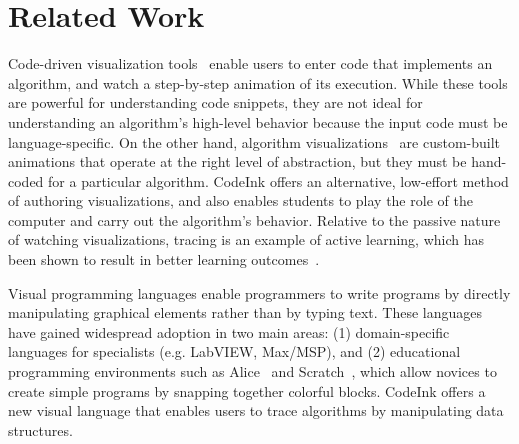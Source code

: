 \section{Related Work}

Code-driven visualization tools~\cite{Guo2013, Sorva2013} enable users to enter
code that implements an algorithm, and watch a step-by-step animation of its
execution. While these tools are powerful for understanding code snippets, they
are not ideal for understanding an algorithm's high-level behavior because the
input code must be language-specific. On the other hand, algorithm
visualizations~\cite{AlgoViz} are custom-built animations that operate at the
right level of abstraction, but they must be hand-coded for a particular
algorithm. CodeInk offers an alternative, low-effort method of authoring
visualizations, and also enables students to play the role of the computer and
carry out the algorithm's behavior. Relative to the passive nature of watching
visualizations, tracing is an example of active learning, which has been shown
to result in better learning outcomes~\cite{Sorva2012Diss}.




Visual programming languages enable programmers to write programs by directly
manipulating graphical elements rather than by typing text. These languages have
gained widespread adoption in two main areas:
(1) domain-specific languages for specialists (e.g. LabVIEW, Max/MSP),
and (2) educational programming environments such as Alice~\cite{Alice2008} and
Scratch~\cite{Scratch2008}, which allow novices to create simple programs by
snapping together colorful blocks. CodeInk offers a new visual language that
enables users to trace algorithms by manipulating data structures.

